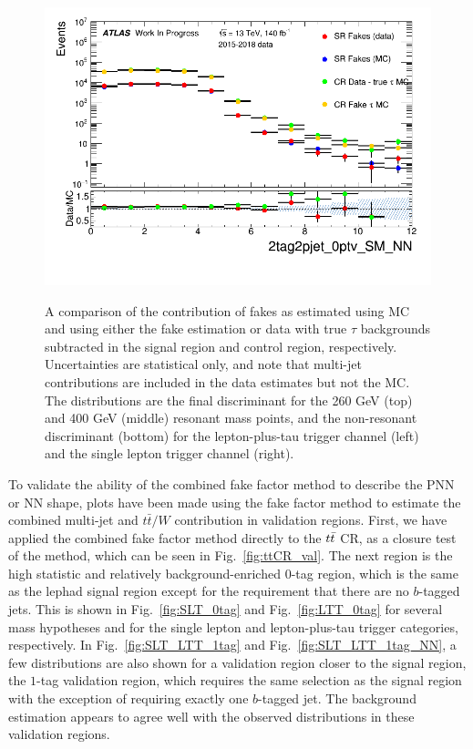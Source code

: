 \begin{figure}
\includegraphics[width=.4\textwidth]{DiHiggs/plots/lephadFF/SLT/2tag2pjet_0ptv_SM_NN_SLT_CR_highPNN_fakes_log.png}\\
\caption{A comparison of  the contribution of fakes as estimated using MC and using either the fake estimation or data with true $\tau$ backgrounds subtracted in the signal region and control region, respectively. Uncertainties are statistical only, and note that multi-jet contributions are included in the data estimates but not the MC. The distributions are the final discriminant for the 260 GeV (top) and 400 GeV (middle) resonant mass points, and the non-resonant discriminant (bottom) for the lepton-plus-tau trigger channel (left) and the single lepton trigger channel (right). }
\label{fig:LH_MC_data_fakes}
\end{figure} 

To validate the ability of the combined fake factor method to describe the PNN or NN shape, plots have been made using the fake factor method to estimate the combined multi-jet and $t\bar{t}/W$ contribution in validation regions. First, we have applied the combined fake factor method directly to the $t\bar{t}$ CR, as a closure test of the method, which can be seen in Fig.~\ref{fig:ttCR_val}. The next region is the high statistic and 
relatively background-enriched $0$-tag region, which is the same as the lephad signal region except for the requirement that there are 
no $b$-tagged jets.  This is shown in Fig.~\ref{fig:SLT_0tag} and Fig.~\ref{fig:LTT_0tag} for several mass hypotheses and for the single lepton and lepton-plus-tau trigger categories, respectively. In Fig.~\ref{fig:SLT_LTT_1tag} and Fig.~\ref{fig:SLT_LTT_1tag_NN}, a few distributions are also shown for a validation region closer to the signal region, the $1$-tag validation region, which requires the same selection as the signal region with the exception of requiring exactly one $b$-tagged jet. The background estimation appears to agree well with the observed distributions in these validation regions.

